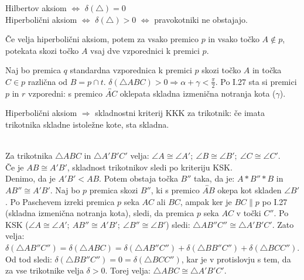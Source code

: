 \begin{posledica}
    Hilbertov aksiom $\Leftrightarrow$ $\delta(\triangle)=0$
    \\ Hiperbolični aksiom $\Leftrightarrow$ $\delta(\triangle)>0$ $\Leftrightarrow$ pravokotniki ne obstajajo.
\end{posledica}

\begin{trditev}
    Če velja hiperbolični aksiom, potem za vsako premico $p$ in vsako točko $A\notin p$, potekata skozi točko $A$ vsaj dve vzporednici k premici $p$.
\end{trditev}

    \begin{dokaz}
        Naj bo premica $q$ standardna vzporednica k premici $p$ skozi točko $A$ in točka $C\in p$ različna od $B=p\cap t$. $\delta(\triangle ABC)>0 \Rightarrow \alpha+\gamma<\frac{\pi}{2}$. Po I.27 sta si premici $p$ in $r$ vzporedni: s premico $\overleftrightarrow{AC}$ oklepata skladna izmenična notranja kota ($\gamma$).
    \end{dokaz}

\begin{trditev}[KKK]
    Hiperbolični aksiom $\Rightarrow$ skladnostni kriterij KKK za trikotnik: če imata trikotnika skladne istoležne kote, sta skladna.
\end{trditev}

    \begin{dokaz}
        \\ Za trikotnika $\triangle ABC$ in $\triangle A'B'C'$ velja: $\angle A\cong \angle A';~\angle B\cong \angle B';~\angle C\cong \angle C'$.
        \\ Če je $AB\cong A'B'$, skladnost trikotnikov sledi po kriteriju KSK.
        \\ Denimo, da je $A'B'<AB$. Potem obstaja točka $B''$ taka, da je: $A\ast B''\ast B$ in $AB''\cong A'B'$. Naj bo $p$ premica skozi $B''$, ki s premico $\overleftrightarrow{AB}$ okepa kot skladen $\angle B'$. Po Paschevem izreki premica $p$ seka $AC$ ali $BC$, ampak ker je $BC\parallel p$ po I.27 (skladna izmenična notranja kota), sledi, da premica $p$ seka $AC$ v točki $C''$. Po KSK ($\angle A\cong\angle A';~AB''\cong A'B';~\angle B''\cong \angle B'$) sledi: $\triangle AB''C''\cong \triangle A'B'C'$. Zato velja: $\delta(\triangle AB''C'')=\delta(\triangle ABC)=\delta(\triangle AB''C'')+\delta(\triangle BB''C'')+\delta(\triangle BCC'')$. Od tod sledi: $\delta(\triangle BB''C'')=0=\delta(\triangle BCC'')$, kar je v protislovju s tem, da za vse trikotnike velja $\delta>0$. Torej velja: $\triangle ABC\cong\triangle A'B'C'$. 
    \end{dokaz}

